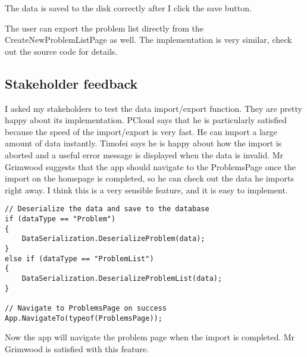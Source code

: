 \documentclass[report.tex]{subfiles}
\begin{document}
The data is saved to the disk correctly after I click the save button.

The user can export the problem list directly from the CreateNewProblemListPage as well. The implementation is very similar, check out the source code for details.

\subsection{Stakeholder feedback}

I asked my stakeholders to test the data import/export function. They are pretty happy about its implementation. PCloud says that he is particularly satisfied because the speed of the import/export is very fast. He can import a large amount of data instantly. Timofei says he is happy about how the import is aborted and a useful error message is displayed when the data is invalid. Mr Grimwood suggests that the app should navigate to the ProblemsPage once the import on the homepage is completed, so he can check out the data he imports right away. I think this is a very sensible feature, and it is easy to implement.

\begin{verbatim}
// Deserialize the data and save to the database
if (dataType == "Problem")
{
    DataSerialization.DeserializeProblem(data);
}
else if (dataType == "ProblemList")
{
    DataSerialization.DeserializeProblemList(data);
}

// Navigate to ProblemsPage on success
App.NavigateTo(typeof(ProblemsPage));
\end{verbatim}

Now the app will navigate the problem page when the import is completed. Mr Grimwood is satisfied with this feature.
\end{document}
